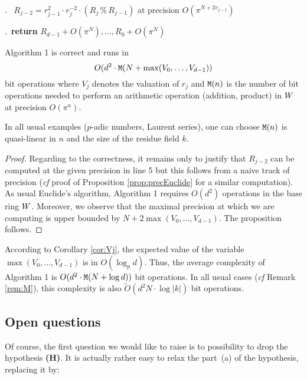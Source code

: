 \documentclass{article}
\begin{document}
\smallskip{}.\ \hspace{0.3cm}{\bf compute} $R_{j-2} = r_{j-1}^2 \cdot r_j^{-2} \cdot (R_j \,\%\, R_{j-1})$ at precision $O(\pi^{N+2 v_{j-1}})$

\smallskip{}.\ {\bf return} $R_{d-1} + O(\pi^N), \ldots,
R_0 + O(\pi^N)$

\vspace{-1ex}\noindent\hrulefill

\begin{prop}
Algorithm 1 is correct and runs in
$$O(d^2 \cdot \text{\tt M}(N + \max(V_0, \ldots, V_{d-1}))$$
bit operations where $V_j$ denotes the valuation of $r_j$ and 
$\text{\tt M}(n)$ is the number of bit operations needed to perform an 
arithmetic operation (addition, product) in $W$ at precision 
$O(\pi^n)$.
\end{prop}

\begin{rem}
\label{rem:M}
In all usual examples ($p$-adic numbers, Laurent series), one can 
choose $\text{\tt M}(n)$ is quasi-linear in $n$ and the size of the residue
field $k$.
\end{rem}

\begin{proof}
Regarding to the correctness, it remains only to justify that $R_{j-2}$ 
can be computed at the given precision in line 5 but this follows 
from a naive track of precision (\emph{cf} proof of Proposition
\ref{prop:precEuclide} for a similar computation).
As usual Euclide's algorithm, Algorithm 1 requires $O(d^2)$ operations 
in the base ring $W$. Moreover, we observe that the maximal precision 
at which we are computing is upper bounded by $N + 2 \max(V_0, \ldots, 
V_{d-1})$. The proposition follows.
\end{proof}

According to Corollary \ref{cor:Vj}, the expected value of the variable 
$\max(V_0, \ldots, V_{d-1})$ is in $O(\log_p d)$. Thus, the average 
complexity of Algorithm 1 is $O(d^2 \cdot \text{\tt M}(N + \log d))$ bit 
operations. In all usual cases (\emph{cf} Remark \ref{rem:M}), this
complexity is also $\tilde O(d^2 N \cdot \log |k|)$ bit operations.

\subsection{Open questions}
\label{subsec:questions}

Of course, the first question we would like to raise is to possibility 
to drop the hypothesis {\bf (H)}. It is actually rather easy to relax
the part~(a) of the hypothesis, replacing it by:
\end{document}
